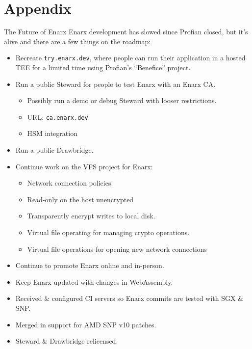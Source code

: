 \documentclass[graphics]{beamer}
\newcommand*\tick{\item[\Checkmark]}
\newcommand{\backupbegin}{
   \newcounter{framenumberappendix}
   \setcounter{framenumberappendix}{\value{framenumber}}
}
\newcommand{\backupend}{
   \addtocounter{framenumberappendix}{-\value{framenumber}}
   \addtocounter{framenumber}{\value{framenumberappendix}} 
}
\begin{document}
\appendix
\backupbegin
\section{Appendix}
\begin{frame}{The Future of Enarx}
    Enarx development has slowed since Profian closed, but it's alive and there are a few things on the roadmap:
     {
        \begin{itemize}
            \item Recreate \texttt{try.enarx.dev}, where people can run their application in a hosted TEE for a limited time using Profian's ``Benefice'' project.
            \item Run a public Steward for people to test Enarx with an Enarx CA.
            \begin{itemize}
                \item Possibly run a demo or debug Steward with looser restrictions.
                \item URL: \texttt{ca.enarx.dev}
                \item HSM integration
            \end{itemize}
            \item Run a public Drawbridge.
            \item Continue work on the VFS project for Enarx:
            \begin{itemize}
                \item Network connection policies
                \item Read-only on the host unencrypted
                \item Transparently encrypt writes to local disk.
                \item Virtual file operating for managing crypto operations.
                \item Virtual file operations for opening new network connections
            \end{itemize}
            \item Continue to promote Enarx online and in-person.
            \item Keep Enarx updated with changes in WebAssembly.
        \end{itemize}
    }
     {
        \begin{itemize}
            \tick Received \& configured CI servers so Enarx commits are tested with SGX \& SNP.
            \tick Merged in support for AMD SNP v10 patches.
            \tick Steward \& Drawbridge relicensed.
        \end{itemize}
    }
\end{frame}
\backupend
\end{document}
